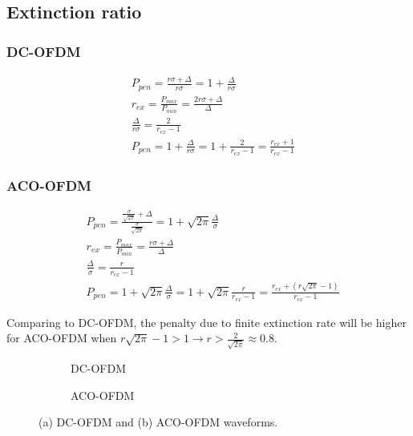 \documentclass[a4paper]{article}
\begin{document}
\subsection{Extinction ratio}
\subsubsection{DC-OFDM}
\begin{align} \nonumber
& P_{pen} = \frac{r\sigma + \Delta}{r\sigma} = 1 + \frac{\Delta}{r\sigma} \\
&r_{ex} = \frac{P_{max}}{P_{min}} = \frac{2r\sigma + \Delta}{\Delta} \\ \nonumber
&\frac{\Delta}{r\sigma} = \frac{2}{r_{ex}-1} \\ 
& P_{pen} = 1 + \frac{\Delta}{r\sigma} = 1 + \frac{2}{r_{ex}-1} = \frac{r_{ex}+1}{r_{ex}-1}
\end{align}

\subsubsection{ACO-OFDM}
\begin{align} \nonumber
& P_{pen} = \frac{\frac{\sigma}{\sqrt{2\pi}} + \Delta}{\frac{\sigma}{\sqrt{2\pi}}} = 1 + \sqrt{2\pi}\frac{\Delta}{\sigma} \\
&r_{ex} = \frac{P_{max}}{P_{min}} = \frac{r\sigma + \Delta}{\Delta} \\ \nonumber
&\frac{\Delta}{\sigma} = \frac{r}{r_{ex}-1} \\ 
& P_{pen} = 1 + \sqrt{2\pi}\frac{\Delta}{\sigma} = 1 + \sqrt{2\pi}\frac{r}{r_{ex}-1} = \frac{r_{ex} + (r\sqrt{2\pi} - 1)}{r_{ex} - 1}
\end{align}

Comparing to DC-OFDM, the penalty due to finite extinction rate will be higher for ACO-OFDM when $r\sqrt{2\pi}-1 > 1 \to r > \frac{2}{\sqrt{2\pi}} \approx 0.8$.

\FloatBarrier
\begin{figure}[h!]
	\centering
	\begin{subfigure}[h!]{\textwidth}
		\centering
		\resizebox{\linewidth}{!}{}
		\caption{DC-OFDM}
	\end{subfigure}%

	\begin{subfigure}[h!]{\textwidth}
		\centering
		\resizebox{\linewidth}{!}{}
		\caption{ACO-OFDM}
	\end{subfigure}
	\caption{(a) DC-OFDM and (b) ACO-OFDM waveforms.}
\end{figure}
\FloatBarrier
\end{document}
